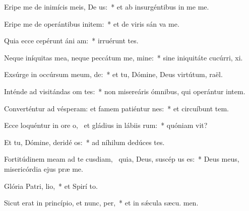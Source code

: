 \item Eripe me de inimícis meis, De us:~* et ab insurgéntibus in me  me.
\item Eripe me de operántibus initem:~* et de viris sán va me.
\item Quia ecce cepérunt áni am:~* irruérunt   tes.
\item Neque iníquitas mea, neque peccátum me, mine:~* sine iniquitáte cucúrri,  xi.
\item Exsúrge in occúrsum meum,  de:~* et tu, Dómine, Deus virtútum,  raël.
\item Inténde ad visitándas om tes:~* non misereáris ómnibus, qui operántur intem.
\item Converténtur ad vésperam: et famem patiéntur  nes:~* et circuíbunt tem.
\item Ecce loquéntur in ore o,~\pscross{} et gládius in lábiis rum:~* quóniam  vit?
\item Et tu, Dómine, deridé os:~* ad níhilum dedúces  tes.
\item Fortitúdinem meam ad te cusdiam,~\pscross{} quia, Deus, suscép us es:~* Deus meus, misericórdia ejus præ me.
\item Glória Patri,  lio,~* et Spirí to.
\item Sicut erat in princípio, et nunc,  per,~* et in sǽcula sæcu. men.
